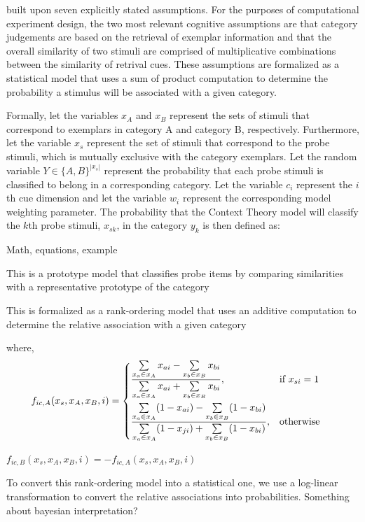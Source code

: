 \documentclass[11pt]{article}
\begin{document}
built upon seven explicitly stated assumptions. For the purposes of computational experiment design, the two most relevant cognitive assumptions are that category judgements are based on the retrieval of exemplar information and that the overall similarity of two stimuli are comprised of multiplicative combinations between the similarity of retrival cues. These assumptions are formalized as a statistical model that uses a sum of product computation to determine the probability a stimulus will be associated with a given category.

Formally, let the variables $x_A$ and $x_B$ represent the sets of stimuli that correspond to exemplars in category A and category B, respectively. Furthermore, let the variable $x_s$ represent the set of stimuli that correspond to the probe stimuli, which is mutually exclusive with the category exemplars. Let the random variable $Y \in \{A,B\}^{|x_s|}$ represent the probability that each probe stimuli is classified to belong in a corresponding category. Let the variable $c_i$ represent the $i$th cue dimension and let the variable $w_i$ represent the corresponding model weighting parameter. The probability that the Context Theory model will classify the $k$th probe stimuli, $x_{sk}$, in the category $y_k$ is then defined as:

Math, equations, example

This is a prototype model that classifies probe items by comparing similarities with a representative prototype of the category

This is formalized as a rank-ordering model that uses an additive computation to determine the relative association with a given category

where, 
\begin{align}
    f_{ic,A}(x_s, x_A, x_B, i) &= 
        \begin{dcases}
            \frac{\sum\limits_{x_a \in x_A} x_{ai} - \sum\limits_{x_b \in x_B} x_{bi}} {\sum\limits_{x_a \in x_A} x_{ai} + \sum\limits_{x_b \in x_B} x_{bi}}, & \text{if } x_{si} = 1 \\
            \frac{\sum\limits_{x_a \in x_A} (1-x_{ai}) - \sum\limits_{x_b \in x_B} (1-x_{bi})} {\sum\limits_{x_a \in x_A} (1-x_{ji}) + \sum\limits_{x_b \in x_B} (1-x_{bi})}, & \text{otherwise } 
        \end{dcases}
\end{align}

$f_{ic,B}(x_s, x_A, x_B, i) = -f_{ic,A}(x_s, x_A, x_B, i)$

To convert this rank-ordering model into a statistical one, we use a log-linear transformation to convert the relative associations into probabilities. Something about bayesian interpretation?
\end{document}
